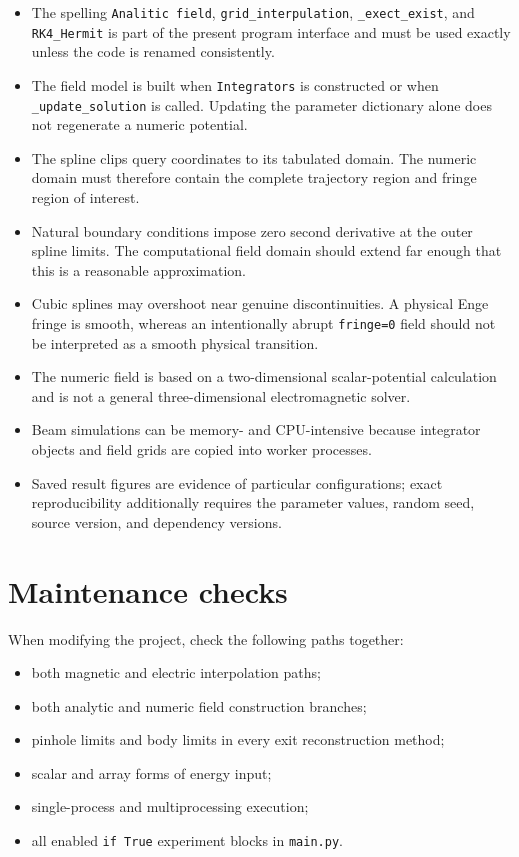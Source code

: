 \documentclass[11pt,a4paper]{report}
\newcommand{\code}[1]{\texttt{#1}}
\begin{document}
\begin{itemize}
  \item The spelling \code{Analitic field}, \code{grid\_interpulation},
        \code{\_exect\_exist}, and \code{RK4\_Hermit} is part of the present
        program interface and must be used exactly unless the code is renamed
        consistently.
  \item The field model is built when \code{Integrators} is constructed or
        when \code{\_update\_solution} is called.  Updating the parameter
        dictionary alone does not regenerate a numeric potential.
  \item The spline clips query coordinates to its tabulated domain.  The
        numeric domain must therefore contain the complete trajectory region
        and fringe region of interest.
  \item Natural boundary conditions impose zero second derivative at the
        outer spline limits.  The computational field domain should extend
        far enough that this is a reasonable approximation.
  \item Cubic splines may overshoot near genuine discontinuities.  A physical
        Enge fringe is smooth, whereas an intentionally abrupt
        \code{fringe=0} field should not be interpreted as a smooth physical
        transition.
  \item The numeric field is based on a two-dimensional scalar-potential
        calculation and is not a general three-dimensional electromagnetic
        solver.
  \item Beam simulations can be memory- and CPU-intensive because integrator
        objects and field grids are copied into worker processes.
  \item Saved result figures are evidence of particular configurations; exact
        reproducibility additionally requires the parameter values, random
        seed, source version, and dependency versions.
\end{itemize}

\section{Maintenance checks}
When modifying the project, check the following paths together:
\begin{itemize}[noitemsep]
  \item both magnetic and electric interpolation paths;
  \item both analytic and numeric field construction branches;
  \item pinhole limits and body limits in every exit reconstruction method;
  \item scalar and array forms of energy input;
  \item single-process and multiprocessing execution;
  \item all enabled \code{if True} experiment blocks in \code{main.py}.
\end{itemize}
\end{document}
